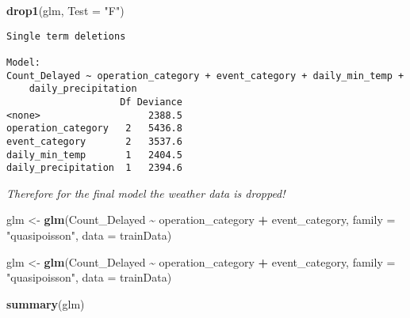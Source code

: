 \documentclass[
]{article}
\newenvironment{Shaded}{\begin{snugshade}}{\end{snugshade}}
\newcommand{\AttributeTok}[1]{\textcolor[rgb]{0.13,0.29,0.53}{#1}}
\newcommand{\FunctionTok}[1]{\textcolor[rgb]{0.13,0.29,0.53}{\textbf{#1}}}
\newcommand{\NormalTok}[1]{#1}
\newcommand{\OtherTok}[1]{\textcolor[rgb]{0.56,0.35,0.01}{#1}}
\newcommand{\SpecialCharTok}[1]{\textcolor[rgb]{0.81,0.36,0.00}{\textbf{#1}}}
\newcommand{\StringTok}[1]{\textcolor[rgb]{0.31,0.60,0.02}{#1}}
\begin{document}
\begin{Shaded}
\begin{Highlighting}[]
\FunctionTok{drop1}\NormalTok{(glm, }\AttributeTok{Test =} \StringTok{"F"}\NormalTok{)}
\end{Highlighting}
\end{Shaded}

\begin{verbatim}
Single term deletions

Model:
Count_Delayed ~ operation_category + event_category + daily_min_temp + 
    daily_precipitation
                    Df Deviance
<none>                   2388.5
operation_category   2   5436.8
event_category       2   3537.6
daily_min_temp       1   2404.5
daily_precipitation  1   2394.6
\end{verbatim}

\emph{Therefore for the final model the weather data is dropped!}

\begin{Shaded}
\begin{Highlighting}[]
\NormalTok{glm }\OtherTok{\textless{}{-}} \FunctionTok{glm}\NormalTok{(Count\_Delayed }\SpecialCharTok{\textasciitilde{}}\NormalTok{ operation\_category }\SpecialCharTok{+}\NormalTok{ event\_category,}
\AttributeTok{family =} \StringTok{"quasipoisson"}\NormalTok{, }\AttributeTok{data =}\NormalTok{ trainData)}
\end{Highlighting}
\end{Shaded}

\begin{Shaded}
\begin{Highlighting}[]
\NormalTok{glm }\OtherTok{\textless{}{-}} \FunctionTok{glm}\NormalTok{(Count\_Delayed }\SpecialCharTok{\textasciitilde{}}\NormalTok{ operation\_category }\SpecialCharTok{+}\NormalTok{ event\_category,}
\AttributeTok{family =} \StringTok{"quasipoisson"}\NormalTok{, }\AttributeTok{data =}\NormalTok{ trainData)}

\FunctionTok{summary}\NormalTok{(glm)}
\end{Highlighting}
\end{Shaded}
\end{document}
